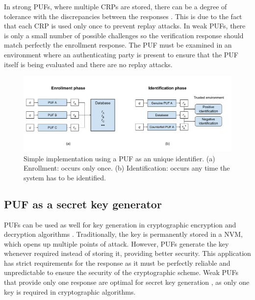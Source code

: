 In strong PUFs, where multiple CRPs are stored, there can be a degree of tolerance with the discrepancies between the responses \cite{Maes2010}. This is due to the fact that each CRP is used only once to prevent replay attacks. In weak PUFs, there is only a small number of possible challenges so the verification response should match perfectly the enrollment response. The PUF must be examined in an environment where an authenticating party is present to ensure that the PUF itself is being evaluated and there are no replay attacks. 

\begin{figure}[H]
    \centering
    \includegraphics[width=15cm]{images/Weak ID.pdf}
    \caption{Simple implementation using a PUF as an unique identifier.  (a) Enrollment: occurs only once. (b) Identification: occurs any time the system has to be identified.}
    \label{fig:id}
\end{figure}


\subsection{PUF as a secret key generator}
\label{sec:enc/dec}
PUFs can be used as well for key generation in cryptographic encryption and decryption algorithms \cite{Suh2007,Rahman2016,Herder2014}. Traditionally, the key is permanently stored in a NVM, which opens up multiple points of attack. However, PUFs generate the key whenever required instead of storing it, providing better security. This application has strict requirements for the response as it must be perfectly reliable and unpredictable to ensure the security of the cryptographic scheme. Weak PUFs that provide only one response are optimal for secret key generation \cite{Maes2010}, as only one key is required in cryptographic algorithms.

